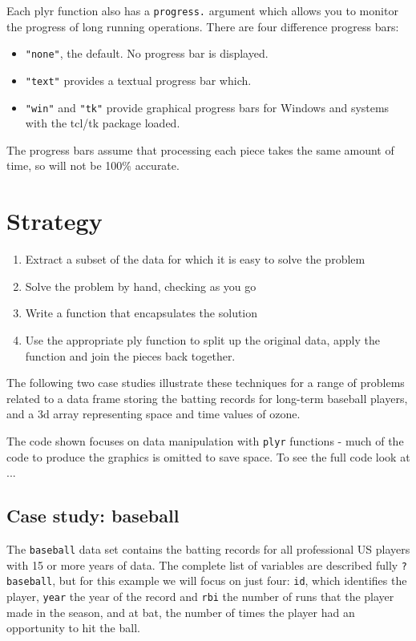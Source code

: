 \documentclass{scrartcl}
\newcommand{\plyr}{{\tt plyr}\xspace}
\begin{document}
Each plyr function also has a {\tt progress.} argument which allows you to monitor the progress of long running operations.  There are four difference progress bars:

\begin{itemize}
  \item {\tt "none"}, the default.  No progress bar is displayed.
  \item {\tt "text"} provides a textual progress bar which.
  \item {\tt "win"} and {\tt "tk"} provide graphical progress bars for Windows and systems with the tcl/tk package loaded.
\end{itemize}

The progress bars assume that processing each piece takes the same amount of time, so will not be 100\% accurate.

\section{Strategy}
\label{sec:strategy}



\begin{enumerate}
  \item Extract a subset of the data for which it is easy to solve the problem
  \item Solve the problem by hand, checking as you go
  \item Write a function that encapsulates the solution
  \item Use the appropriate ply function to split up the original data, apply the function and join the pieces back together.
  
\end{enumerate}

The following two case studies illustrate these techniques for a range of problems related to a data frame storing the batting records for long-term baseball players, and a 3d array representing space and time values of ozone.

The code shown focuses on data manipulation with \plyr functions - much of the code to produce the graphics is omitted to save space.  To see the full code look at ...

\subsection{Case study: baseball}

The {\tt baseball} data set contains the batting records for all professional US players with 15 or more years of data.  The complete list of variables are described fully {\tt ?baseball}, but for this example we will focus on just four: {\tt id}, which identifies the player, {\tt year} the year of the record and {\tt rbi} the number of runs that the player made in the season, and {\tt} at bat, the number of times the player had an opportunity to hit the ball.
\end{document}
